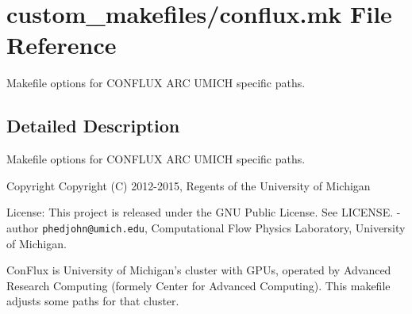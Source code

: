 \section{custom\-\_\-makefiles/conflux.mk File Reference}
\label{conflux_8mk}


Makefile options for C\-O\-N\-F\-L\-U\-X A\-R\-C U\-M\-I\-C\-H specific paths.  




\subsection{Detailed Description}
Makefile options for C\-O\-N\-F\-L\-U\-X A\-R\-C U\-M\-I\-C\-H specific paths. \begin{DoxyCopyright}{Copyright}
Copyright (C) 2012-\/2015, Regents of the University of Michigan 
\end{DoxyCopyright}
\begin{DoxyParagraph}{License\-:}
This project is released under the G\-N\-U Public License. See L\-I\-C\-E\-N\-S\-E. -\/author {\tt phedjohn@umich.\-edu}, Computational Flow Physics Laboratory, University of Michigan.
\end{DoxyParagraph}
Con\-Flux is University of Michigan's cluster with G\-P\-Us, operated by Advanced Research Computing (formely Center for Advanced Computing). This makefile adjusts some paths for that cluster. 